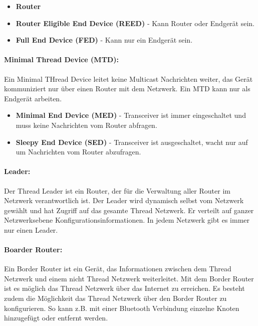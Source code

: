 \begin{itemize}
	\item \textbf{Router}
	\item \textbf{Router Eligible End Device (REED)} - Kann Router oder Endgerät sein.
	\item \textbf{Full End Device (FED)} - Kann nur ein Endgerät sein.
\end{itemize}


\paragraph{Minimal Thread Device (MTD):}
Ein Minimal THread Device leitet keine Multicast Nachrichten weiter, das Gerät kommuniziert nur über einen Router mit dem Netzwerk. Ein MTD kann nur als Endgerät arbeiten. \cite[Seite 1-4]{thread_group_inc_thread_2017}

\begin{itemize}
	\item \textbf{Minimal End Device (MED)} - Transceiver ist immer eingeschaltet und muss keine Nachrichten vom Router abfragen. 
	\item \textbf{Sleepy End Device (SED)} - Transceiver ist ausgeschaltet, wacht nur auf um Nachrichten vom Router abzufragen.
\end{itemize}

\paragraph{Leader:}
Der Thread Leader ist ein Router, der für die Verwaltung aller Router im Netzwerk verantwortlich ist. Der Leader wird dynamisch selbst vom Netzwerk gewählt und hat Zugriff auf das gesamte Thread Netzwerk. Er verteilt auf ganzer Netzwerksebene Konfigurationsinformationen. In jedem Netzwerk gibt es immer nur einen Leader. \cite[Seite 1-4]{thread_group_inc_thread_2017}

\paragraph{Boarder Router:}
Ein Border Router ist ein Gerät, das Informationen zwischen dem Thread Netzwerk und einem nicht Thread Netzwerk weiterleitet. Mit dem Border Router ist es möglich das Thread Netzwerk über das Internet zu erreichen. Es besteht zudem die Möglichkeit das Thread Netzwerk über den Border Router zu konfigurieren. So kann z.B. mit einer Bluetooth Verbindung einzelne Knoten hinzugefügt oder entfernt werden. \cite[Seite 1-4]{thread_group_inc_thread_2017}

